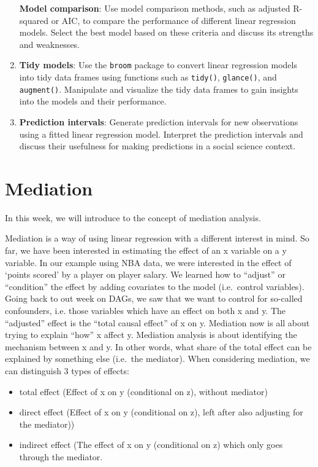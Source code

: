 \documentclass[
]{book}
\providecommand{\tightlist}{%
  \setlength{\itemsep}{0pt}\setlength{\parskip}{0pt}}
\begin{document}
\begin{enumerate}
  \textbf{Model comparison}: Use model comparison methods, such as adjusted R-squared or AIC, to compare the performance of different linear regression models. Select the best model based on these criteria and discuss its strengths and weaknesses.
\item
  \textbf{Tidy models}: Use the \texttt{broom} package to convert linear regression models into tidy data frames using functions such as \texttt{tidy()}, \texttt{glance()}, and \texttt{augment()}. Manipulate and visualize the tidy data frames to gain insights into the models and their performance.
\item
  \textbf{Prediction intervals}: Generate prediction intervals for new observations using a fitted linear regression model. Interpret the prediction intervals and discuss their usefulness for making predictions in a social science context.
\end{enumerate}

\hypertarget{med}{%
\chapter{Mediation}\label{med}}

In this week, we will introduce to the concept of mediation analysis.

Mediation is a way of using linear regression with a different interest in mind.
So far, we have been interested in estimating the effect of an x variable on a
y variable. In our example using NBA data, we were interested in the effect of
`points scored' by a player on player salary. We learned how to ``adjust'' or ``condition''
the effect by adding covariates to the model (i.e.~control variables). Going back to
out week on DAGs, we saw that we want to control for so-called confounders, i.e.
those variables which have an effect on both x and y. The ``adjusted'' effect is the
``total causal effect'' of x on y.
Mediation now is all about trying to explain ``how'' x affect y. Mediation analysis
is about identifying the mechanism between x and y. In other words, what share
of the total effect can be explained by something else (i.e.~the mediator). When
considering mediation, we can distinguish 3 types of effects:

\begin{itemize}
\tightlist
\item
  total effect (Effect of x on y (conditional on z), without mediator)
\item
  direct effect (Effect of x on y (conditional on z), left after also adjusting for the mediator))
\item
  indirect effect (The effect of x on y (conditional on z) which only goes through the mediator.
\end{itemize}
\end{document}
